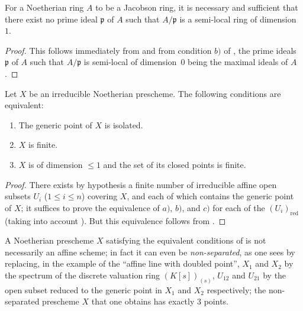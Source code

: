 \begin{corollary}[10.5.2]
\label{IV.10.5.2}
For a Noetherian ring $A$ to be a Jacobson ring, it is necessary and sufficient that there exist no prime ideal $\mathfrak{p}$ of $A$ such that $A/\mathfrak{p}$ is a semi-local ring of dimension $1$.
\end{corollary}

\begin{proof}
This follows immediately from  and from condition $b)$ of , the prime ideals $\mathfrak{p}$ of $A$ such that $A/\mathfrak{p}$ is semi-local of dimension~$0$ being the maximal ideals of $A$.
\end{proof}

\begin{corollary}[10.5.3]
\label{IV.10.5.3}
Let $X$ be an irreducible Noetherian prescheme.
The following conditions are equivalent:
\begin{enumerate}[label=\emph{\alph*)}]
  \item The generic point of $X$ is isolated.
  \item $X$ is finite.
  \item $X$ is of dimension $\leq 1$ and the set of its closed points is finite.
\end{enumerate}
\end{corollary}

\begin{proof}
There exists by hypothesis a finite number of irreducible affine open subsets $U_i$ ($1\leq i\leq n$) covering $X$, and each of which contains the generic point of $X$; it suffices to prove the equivalence of $a)$, $b)$, and $c)$ for each of the $(U_i)_{\mathrm{red}}$ (taking into account ).
But this equivalence follows from .
\end{proof}

\begin{remark}[10.5.4]
\label{IV.10.5.4}
A Noetherian prescheme $X$ satisfying the equivalent conditions of  is not necessarily an affine scheme; in fact it can even be \emph{non-separated}, as one sees by replacing, in the example  of the ``affine line with doubled point'', $X_1$ and $X_2$ by the spectrum of the discrete valuation ring $(K[s])_{(s)}$, $U_{12}$ and $U_{21}$ by the open subset reduced to the generic point in $X_1$ and $X_2$ respectively; the non-separated prescheme $X$ that one obtains has exactly $3$ points.
\end{remark}

